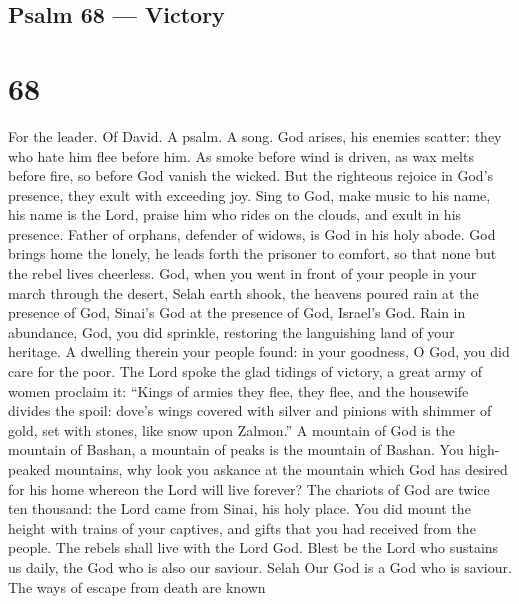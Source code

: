 \hypertarget{psalm-68-victory}{%
\subsection{Psalm 68 --- Victory}\label{psalm-68-victory}}

\hypertarget{section-67}{%
\section{68}\label{section-67}}

For the leader. Of David. A psalm. A song.  God arises, his
enemies scatter: they who hate him flee before him.  As
smoke before wind is driven, as wax melts before fire, so before God
vanish the wicked.  But the righteous rejoice in God's
presence, they exult with exceeding joy.  Sing to God, make
music to his name, his name is the Lord, praise him who rides on the
clouds, and exult in his presence.  Father of orphans,
defender of widows, is God in his holy abode.  God brings
home the lonely, he leads forth the prisoner to comfort, so that none
but the rebel lives cheerless.  God, when you went in front
of your people in your march through the desert, Selah 
earth shook, the heavens poured rain at the presence of God, Sinai's God
at the presence of God, Israel's God.  Rain in abundance,
God, you did sprinkle, restoring the languishing land of your heritage.
 A dwelling therein your people found: in your goodness, O
God, you did care for the poor.  The Lord spoke the glad
tidings of victory, a great army of women proclaim it: 
``Kings of armies they flee, they flee, and the housewife divides the
spoil:  dove's wings covered with silver and pinions with
shimmer of gold,  set with stones, like snow upon Zalmon.''
 A mountain of God is the mountain of Bashan, a mountain of
peaks is the mountain of Bashan.  You high-peaked
mountains, why look you askance at the mountain which God has desired
for his home whereon the Lord will live forever?  The
chariots of God are twice ten thousand: the Lord came from Sinai, his
holy place.  You did mount the height with trains of your
captives, and gifts that you had received from the people. The rebels
shall live with the Lord God.  Blest be the Lord who
sustains us daily, the God who is also our saviour. Selah 
Our God is a God who is saviour. The ways of escape from death are known
